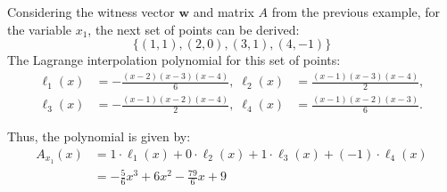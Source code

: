 \documentclass{zkdl-presentation-template}
\begin{document}
    \begin{frame}
        \begin{example}
            Considering the witness vector $\boldsymbol{w}$ and matrix $A$ from the previous example, for the variable
            $x_1$, the next set of points can be derived:
            \vspace{-10pt}
            \begin{equation*}
                \{(1,1), (2,0), (3,1), (4,-1)\}
            \end{equation*}
            The Lagrange interpolation polynomial for this set of points:
            \begin{align*}
                \ell_1(x) &= -\frac{(x - 2)(x - 3)(x - 4)}{6}, \; \ell_2(x) &= \frac{(x - 1)(x - 3)(x - 4)}{2}, \\
                \ell_3(x) &= -\frac{(x - 1)(x - 2)(x - 4)}{2}, \; \ell_4(x) &= \frac{(x - 1)(x - 2)(x - 3)}{6}.
            \end{align*}

            Thus, the polynomial is given by:
            \begin{align*}
                A_{x_1}(x) &= 1 \cdot \ell_1(x) + 0 \cdot \ell_2(x) + 1 \cdot \ell_3(x) + (-1) \cdot \ell_4(x) \\
                &= -\frac{5}{6} x^3 + 6x^2 - \frac{79}{6} x + 9
            \end{align*}
        \end{example}
    \end{frame}
\end{document}
